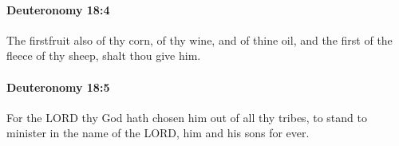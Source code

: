 		\paragraph{Deuteronomy 18:4} %
			\label{DEUTERONOMY-18-4}

			The firstfruit also of thy corn, of thy wine, and of thine oil, and the first of the fleece of thy sheep, shalt thou give him.


		\paragraph{Deuteronomy 18:5} %
			\label{DEUTERONOMY-18-5}

			For the LORD thy God hath chosen him out of all thy tribes, to stand to minister in the name of the LORD, him and his sons for ever.


